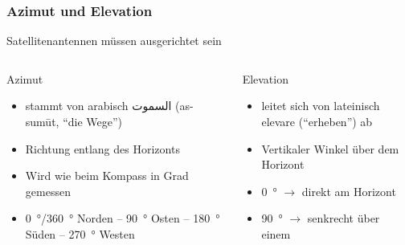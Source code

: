 \begin{frame}
\frametitle{Azimut und Elevation}
Satellitenantennen müssen ausgerichtet sein
\begin{columns}
    \begin{column}{0.48\textwidth}
    Azimut

\begin{itemize}
  \item stammt von arabisch السموت (as-sumūt, \enquote{die Wege})
  \item Richtung entlang des Horizonts
  \item Wird wie beim Kompass in Grad gemessen
  \item \qty{0}{\degree}/\qty{360}{\degree} Norden – \qty{90}{\degree} Osten – \qty{180}{\degree} Süden – \qty{270}{\degree} Westen
  \end{itemize}

    \end{column}
   \begin{column}{0.48\textwidth}
       Elevation

\begin{itemize}
  \item leitet sich von lateinisch elevare (\enquote{erheben}) ab
  \item Vertikaler Winkel über dem Horizont
  \item \qty{0}{\degree} $\rightarrow$ direkt am Horizont
  \item \qty{90}{\degree} $\rightarrow$ senkrecht über einem
  \end{itemize}

   \end{column}
\end{columns}

\end{frame}

\begin{frame}
\end{frame}

